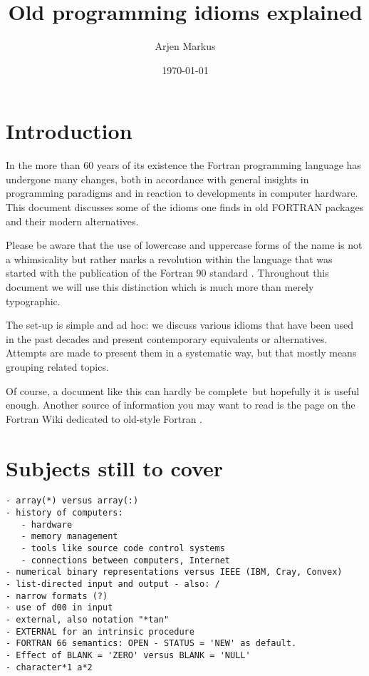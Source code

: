 \documentclass{article}
\date{\today}
\author{Arjen Markus}
\title{Old programming idioms explained}
\begin{document}
\maketitle

\tableofcontents
\newpage

\section{Introduction}
In the more than 60 years of its existence the Fortran programming
language has undergone many changes, both in accordance with general insights
in programming paradigms and in reaction to developments in computer hardware.
This document discusses some of the idioms one finds in old FORTRAN packages
and their modern alternatives.

Please be aware that the use of lowercase and uppercase forms of the name is
not a whimsicality but rather marks a revolution within the language that was
started with the publication of the Fortran 90 standard \cite{Fortran90Standard}. Throughout
this document we will use this distinction which is much more than merely
typographic.

The set-up is simple and ad hoc: we discuss various idioms that have been
used in the past decades and present contemporary equivalents or alternatives.
Attempts are made to present them in a systematic way, but that mostly means grouping
related topics.

Of course, a document like this can hardly be complete\, but hopefully it is
useful enough. Another source of information you may want to read is the page on the Fortran Wiki
dedicated to old-style Fortran \cite{ModernizeOldFortran}.












\section{Subjects still to cover}
\begin{verbatim}
- array(*) versus array(:)
- history of computers:
   - hardware
   - memory management
   - tools like source code control systems
   - connections between computers, Internet
- numerical binary representations versus IEEE (IBM, Cray, Convex)
- list-directed input and output - also: /
- narrow formats (?)
- use of d00 in input
- external, also notation "*tan"
- EXTERNAL for an intrinsic procedure
- FORTRAN 66 semantics: OPEN - STATUS = 'NEW' as default.
- Effect of BLANK = 'ZERO' versus BLANK = 'NULL'
- character*1 a*2
\end{verbatim}
\end{document}
